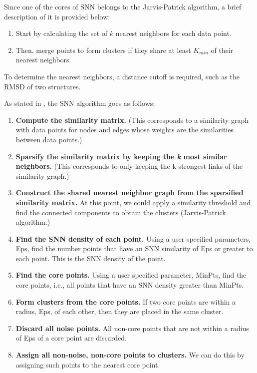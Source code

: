Since one of the cores of SNN belongs to the Jarvis-Patrick algorithm, a brief description of it is provided below:

\begin{enumerate}
	\item Start by calculating the set of $k$ nearest neighbors for each data point.
	\item Then, merge points to form clusters if they share at least $K_{min}$ of their nearest neighbors.
\end{enumerate}

To determine the nearest neighbors, a distance cutoff is required, such as the RMSD of two structures.

As stated in \cite{ertoz2003finding}, the SNN algorithm goes as follows:
\begin{enumerate}
	\item \textbf{Compute the similarity matrix.} (This corresponds	to a similarity graph with data points for nodes and edges whose weights are the similarities between data points.)
	\item \textbf{Sparsify the similarity matrix by keeping the \textit{k} most similar neighbors.} (This corresponds to only keeping the k strongest links	of the similarity graph.)
	\item \textbf{Construct the shared nearest neighbor graph from the sparsified similarity matrix.} At this point, we could apply a similarity threshold and find the connected components to obtain the clusters (Jarvis-Patrick algorithm.) 
	\item \textbf{Find the SNN density of each point.} Using a user specified parameters, Eps, find the number points that have an SNN similarity of Eps or greater to each point. This is the SNN density of the point. 
	\item \textbf{Find the core points.} Using a user specified parameter, MinPts, find the core points, i.e., all points that have an SNN density greater than MinPts.
	\item \textbf{Form clusters from the core points.} If two core points are within a radius, Eps, of each other, then they are placed in the same cluster.
	\item \textbf{Discard all noise points.} All non-core points that are not within a radius of Eps of a core point are discarded.
	\item \textbf{Assign all non-noise, non-core points to clusters.} We can do this by assigning such points to the nearest core point. 
\end{enumerate}


